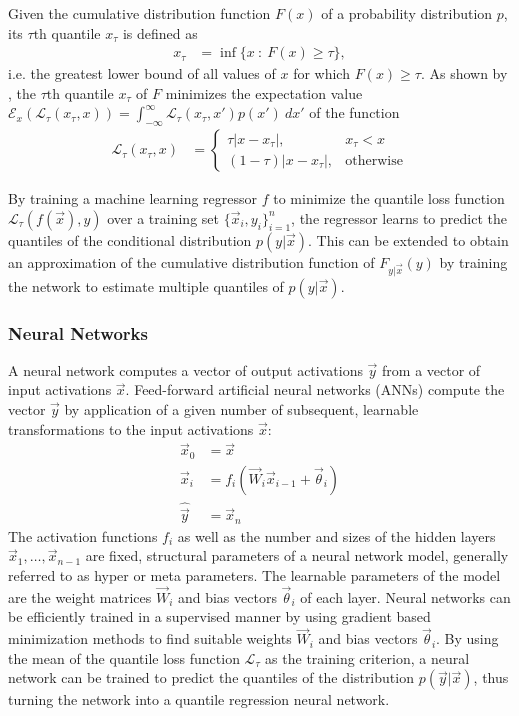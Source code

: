 \documentclass[journal abbreviation, manuscript]{copernicus}
\begin{document}
    Given the cumulative distribution function $F(x)$ of a probability distribution
    $p$, its $\tau\text{th}$ quantile $x_\tau$ is defined as
    \begin{align}
    x_\tau &= \inf \{x \: : \: F(x) \geq \tau \},
    \end{align}
    i.e. the greatest lower bound of all values of $x$ for which $F(x) \geq \tau$.
    As shown by \citet{koenker}, the $\tau\text{th}$ quantile $x_\tau$ of $F$
    minimizes the expectation value $\mathcal{E}_x\left ( \mathcal{L}_\tau(x_\tau, x) \right) = \int_{-\infty}^\infty \mathcal{L}_\tau(x_\tau, x') p(x') \: dx'$
    of the function
    \begin{align}\label{eq:quantile_loss}
      \mathcal{L}_{\tau}(x_\tau, x) &=
      \begin{cases}
        \tau |x - x_\tau|, & x_\tau < x \\
        (1 - \tau)|x - x_\tau|, &\text{otherwise}
        \end{cases}
    \end{align}

    By training a machine learning regressor $f$ to minimize the quantile loss
    function $\mathcal{L}_\tau(f(\vec{x}), y)$ over a training set $\{\vec{x}_i,
    y_i\}_{i = 1}^n$, the regressor learns to predict the quantiles of the
    conditional distribution $p(y | \vec{x})$. This can be extended to obtain an
    approximation of the cumulative distribution function of $F_{y | \vec{x}}(y)$ by
    training the network to estimate multiple quantiles of $p(y | \vec{x})$.

\subsubsection{Neural Networks}

A neural network computes a vector of output activations $\vec{y}$ from a vector
of input activations $\vec{x}$. Feed-forward artificial neural networks (ANNs)
compute the vector $\vec{y}$ by application of a given number of subsequent,
learnable transformations to the input activations $\vec{x}$:
\begin{align*}
    \vec{x}_0 &= \vec{x}\\
    \vec{x}_i &= f_{i}
    \left ( \vec{W}_{i} \vec{x}_{i - 1}+ \vec{\theta}_i \right ) \\
    \hat{\vec{y}} &= \vec{x}_{n}
\end{align*}
The activation functions $f_i$ as well as the number and sizes of the hidden
layers $\vec{x}_1, \ldots, \vec{x}_{n-1}$ are fixed, structural parameters of a
neural network model, generally referred to as hyper or meta parameters. The learnable
parameters of the model are the weight matrices $\vec{W}_i$ and bias vectors
$\vec{\theta}_i$ of each layer. Neural networks can be efficiently trained in
a supervised manner by using gradient based minimization methods to find
suitable weights $\vec{W}_i$ and bias vectors $\vec{\theta}_i$. By using the
mean of the quantile loss function $\mathcal{L}_\tau$ as the training criterion,
a neural network can be trained to predict the quantiles of the distribution
$p(\vec{y} | \vec{x})$, thus turning the network into a quantile regression
neural network.
\end{document}
